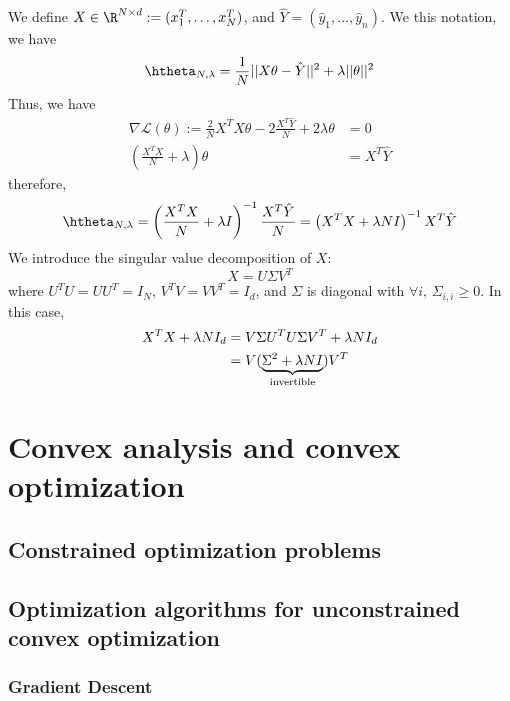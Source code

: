 \documentclass{../cs-classes/cs-classes}
\begin{document}
We define $X\in\R^{N\times d} := (x_1^T, \dots, x_N^T)$, and $\hat{Y}=(\hat{y}_1, \dots, \hat{y}_n)$. We this notation, we have
\begin{equation*}
    \htheta_{N, \lambda} = \frac{1}{N}||X\theta-\hat{Y}||^2 + \lambda||\theta||^2
\end{equation*}
Thus, we have
\begin{equation*}
    \begin{aligned}
        \nabla\mathcal{L}(\theta) := \frac{2}{N}X^TX\theta - 2\frac{X^T\hat{Y}}{N}+2\lambda\theta &= 0\\
        (\frac{X^TX}{N}+\lambda)\theta &= X^T\hat{Y}
    \end{aligned}
\end{equation*}
therefore,
\begin{equation*}
    \htheta_{N, \lambda} = \left(\frac{X^TX}{N}+\lambda I\right)^{-1}\frac{X^T\hat{Y}}{N} = \left(X^TX+\lambda N I\right)^{-1}X^T\hat{Y}
\end{equation*}
We introduce the singular value decomposition of $X$:
\begin{equation*}
    X = U\Sigma V^T
\end{equation*}
where $U^TU = UU^T = I_N$, $V^TV = VV^T=I_d$, and $\Sigma$ is diagonal with $\forall i, \,\Sigma_{i, i} \geq 0$.
In this case,
\begin{equation*}
\begin{aligned}
    X^TX + \lambda NI_d &= V\Sigma U^T U \Sigma V^T + \lambda N I_d\\
    &= V(\underbrace{\Sigma^2 + \lambda N I}_{\textnormal{invertible}}) V^T
\end{aligned}
\end{equation*}

\section{Convex analysis and convex optimization}
\subsection{Constrained optimization problems}

\subsection{Optimization algorithms for unconstrained convex optimization}
\subsubsection{Gradient Descent}
\end{document}
